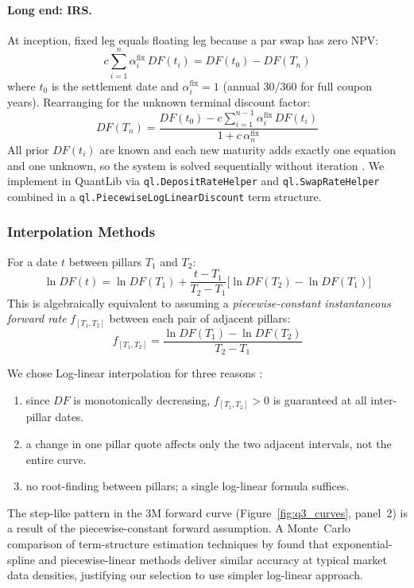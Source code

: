 \documentclass[11pt,a4paper]{article}
\begin{document}
\paragraph{Long end: IRS.}
At inception, fixed leg equals floating leg because a par swap has zero NPV:
\begin{equation}
  c \sum_{i=1}^{n} \alpha^{\text{fix}}_i \, DF(t_i) = DF(t_0) - DF(T_n)
  \label{eq:par_swap}
\end{equation}
where $t_0$ is the settlement date and $\alpha^{\text{fix}}_i = 1$ (annual 30/360
for full coupon years).  Rearranging for the unknown terminal discount factor:
\begin{equation}
  DF(T_n) = \frac{DF(t_0) - c\displaystyle\sum_{i=1}^{n-1}\alpha^{\text{fix}}_i\,DF(t_i)}
                 {1 + c\,\alpha^{\text{fix}}_n}
  \label{eq:bootstrap_irs}
\end{equation}
All prior $DF(t_i)$ are known and each new maturity adds
exactly one equation and one unknown, so the system is solved sequentially without iteration \parencite[p.~437]{Hull2022}.
We implement in QuantLib via \texttt{ql.DepositRateHelper} and
\texttt{ql.SwapRateHelper} combined in a
\texttt{ql.PiecewiseLogLinearDiscount} term structure.

\subsubsection{Interpolation Methods}

For a date $t$ between pillars $T_1$ and $T_2$:
\begin{equation}
  \ln DF(t) = \ln DF(T_1)
  + \frac{t-T_1}{T_2-T_1}\bigl[\ln DF(T_2) - \ln DF(T_1)\bigr]
  \label{eq:loglin}
\end{equation}
This is algebraically equivalent to assuming a \emph{piecewise-constant
instantaneous forward rate} $f_{[T_1,T_2]}$ between each pair of adjacent pillars:
\begin{equation}
  f_{[T_1,T_2]} = \frac{\ln DF(T_1) - \ln DF(T_2)}{T_2 - T_1}
  \label{eq:fwd_const}
\end{equation}

We chose Log-linear interpolation for three
reasons \parencite{HaganWest2006}:
\begin{enumerate}\setlength{\itemsep}{1pt}
  \item since $DF$ is monotonically
    decreasing, $f_{[T_1,T_2]} > 0$ is guaranteed at all inter-pillar dates.
  \item a change in one pillar quote affects only the
    two adjacent intervals, not the entire curve.
  \item no root-finding between pillars;
    a single log-linear formula suffices.
\end{enumerate}
The step-like pattern in the 3M forward curve (Figure~\ref{fig:q3_curves},
panel~2) is a result of the piecewise-constant forward
assumption. A Monte~Carlo comparison of term-structure estimation techniques by \textcite{BiuonoGregoryAllen1992} found that exponential-spline and
piecewise-linear methods deliver similar accuracy at typical market data
densities, justifying our selection to use simpler log-linear approach.
\end{document}
